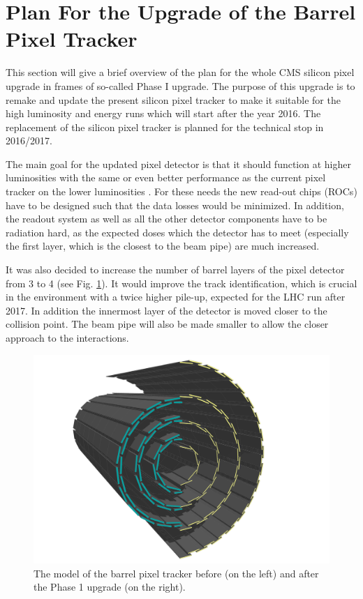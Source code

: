 \section{Plan For the Upgrade of the Barrel Pixel Tracker}

This section will give a brief overview of the plan for the whole CMS silicon pixel upgrade in frames of so-called
Phase I upgrade. The purpose of this upgrade is to remake and update the present silicon pixel tracker to make it 
suitable for the high luminosity and energy runs which will start after the year 2016. The replacement of the silicon
pixel tracker is planned for the technical stop in 2016/2017. 

The main goal for the updated pixel detector is that it should function at higher luminosities with the same or even
better performance as the current pixel tracker on the lower luminosities \cite{CMS:2012sda}. For these needs the new read-out chips
(ROCs) have to be designed such that the data losses would be minimized. In addition, the readout system as well as all
the other detector components have to be radiation hard, as the expected doses which the detector has to meet (especially
the first layer, which is the closest to the beam pipe) are much increased.

It was also decided to increase the number of barrel layers of the pixel detector from 3 to 4 (see Fig. \ref{fig:tracker_4}).
It would improve the track identification, which is crucial in the environment with a twice higher pile-up, expected for the 
LHC run after 2017. In addition the innermost layer of the detector is moved closer to the collision point. The beam pipe
will also be made smaller to allow the closer approach to the interactions.

\begin{figure}[t]
 \centering
 \includegraphics[width=1.0\textwidth]{021_pixel_upgrade/plots/pixel_phase1_4_layers.png}
 \caption{The model of the barrel pixel tracker before (on the left) and after the Phase 1 upgrade (on the right).}
 \label{fig:tracker_4}
\end{figure}

